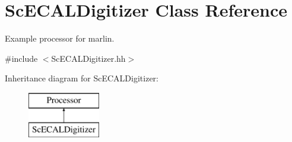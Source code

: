 \section{Sc\-E\-C\-A\-L\-Digitizer Class Reference}
\label{classScECALDigitizer}


Example processor for marlin.  




{\ttfamily \#include $<$Sc\-E\-C\-A\-L\-Digitizer.\-hh$>$}

Inheritance diagram for Sc\-E\-C\-A\-L\-Digitizer\-:\begin{figure}[H]
\begin{center}
\leavevmode
\includegraphics[height=2.000000cm]{classScECALDigitizer}
\end{center}
\end{figure}
